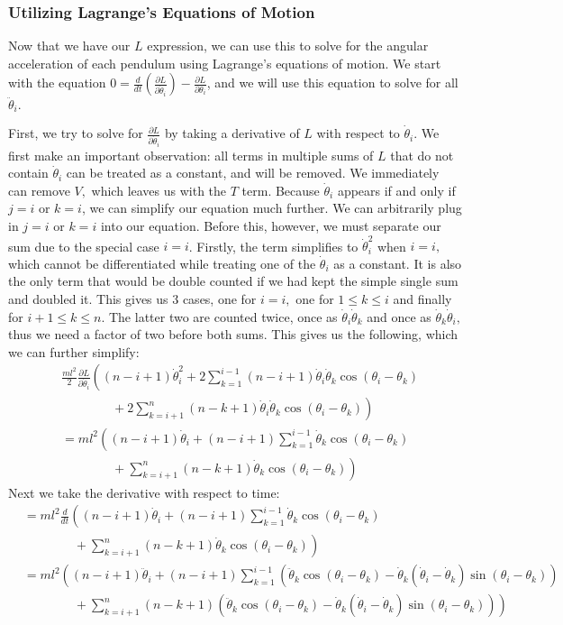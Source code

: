 \documentclass{article}
\begin{document}
\subsubsection{Utilizing Lagrange's Equations of Motion}
Now that we have our $L$ expression, we can use this to solve for the angular acceleration of each pendulum using Lagrange's equations of motion. We start with the equation $0 = \frac{d}{dt}\left(\frac{\partial L}{\partial \dot \theta_i}\right) - \frac{\partial L}{\partial \theta_i}$, and we will use this equation to solve for all $\ddot\theta_i.$

First, we try to solve for $\frac{\partial L}{\partial \dot \theta_i}$ by taking a derivative of $L$ with respect to $\dot\theta_i$. We first make an important observation: all terms in multiple sums of $L$ that do not contain $\dot\theta_i$ can be treated as a constant, and will be removed. We immediately can remove $V,$ which leaves us with the $T$ term. Because $\dot\theta_i$ appears if and only if $j=i$ or $k=i$, we can simplify our equation much further. We can arbitrarily plug in $j=i$ or $k=i$ into our equation. Before this, however, we must separate our sum due to the special case $i=i$. Firstly, the term simplifies to $\dot\theta_i^2$ when $i=i,$ which cannot be differentiated while treating one of the $\dot\theta_i$ as a constant. It is also the only term that would be double counted if we had kept the simple single sum and doubled it. This gives us 3 cases, one for $i=i,$ one for $1\leq k\le i$ and finally for $i+1\leq k \leq n$. The latter two are counted twice, once as $\dot\theta_i\dot\theta_k$ and once as $\dot\theta_k\dot\theta_i,$ thus we need a factor of two before both sums. This gives us the following, which we can further simplify:
\begin{align*}
&\frac{ml^2}{2}\frac{\partial L}{\partial \dot \theta_i}\left((n-i+1)\dot\theta_i^2 + 2\sum_{k=1}^{i-1}(n-i+1)\dot\theta_i\dot\theta_k\cos(\theta_i-\theta_k)\right.\\
&\qquad\qquad+ \left.2\sum_{k=i+1}^n(n-k+1)\dot\theta_i\dot\theta_k\cos(\theta_i-\theta_k)\right)\\
&= ml^2\left((n-i+1)\dot\theta_i + (n-i+1)\sum_{k=1}^{i-1}\dot\theta_k\cos(\theta_i-\theta_k)\right.\\
&\qquad\qquad+ \left.\sum_{k=i+1}^n(n-k+1)\dot\theta_k\cos(\theta_i-\theta_k)\right)
\end{align*}
Next we take the derivative with respect to time:
\begin{align*}
&= ml^2\frac{d}{dt}\left((n-i+1)\dot\theta_i + (n-i+1)\sum_{k=1}^{i-1}\dot\theta_k\cos(\theta_i-\theta_k)\right.\\
&\qquad\qquad+ \left.\sum_{k=i+1}^n(n-k+1)\dot\theta_k\cos(\theta_i-\theta_k)\right)\\
&= ml^2\left((n-i+1)\ddot\theta_i + (n-i+1)\sum_{k=1}^{i-1}\left(\ddot\theta_k\cos(\theta_i-\theta_k)-\dot\theta_k(\dot\theta_i-\dot\theta_k)\sin(\theta_i-\theta_k)\right)\right.\\
&\qquad\qquad+ \left.\sum_{k=i+1}^n(n-k+1)\left(\ddot\theta_k\cos(\theta_i-\theta_k)-\dot\theta_k(\dot\theta_i-\dot\theta_k)\sin(\theta_i-\theta_k)\right)\right)\\
\end{align*}
\end{document}
